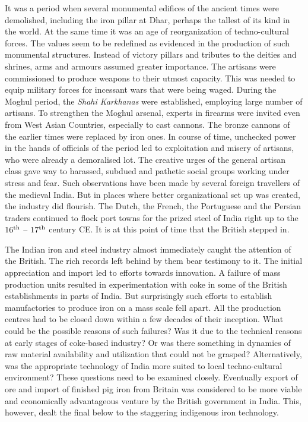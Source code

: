 It was a period when several monumental edifices of the ancient times were demolished, including the iron pillar at Dhar, perhaps the tallest of its kind in the world. At the same time it was an age of reorganization of techno-cultural forces. The values seem to be redefined as evidenced in the production of such monumental structures. Instead of victory pillars and tributes to the deities and shrines, arms and armours assumed greater importance. The artisans were commissioned to produce weapons to their utmost capacity. This was needed to equip military forces for incessant wars that were being waged. During the Moghul period, the \textit{Shahi Karkhanas} were established, employing large number of artisans. To strengthen the Moghul arsenal, experts in firearms were invited even from West Asian Countries, especially to cast cannons. The bronze cannons of the earlier times were replaced by iron ones. In course of time, unchecked power in the hands of officials of the period led to exploitation and misery of artisans, who were already a demoralised lot. The creative urges of the general artisan class gave way to harassed, subdued and pathetic social groups working under stress and fear. Such observations have been made by several foreign travellers of the medieval India. But in places where better organizational set up was created, the industry did flourish. The Dutch, the French, the Portuguese and the Persian traders continued to flock port towns for the prized steel of India right up to the $16^{\rm th}$ – $17^{\rm th}$ century CE. It is at this point of time that the British stepped in.

The Indian iron and steel industry almost immediately caught the attention of the British. The rich records left behind by them bear testimony to it. The initial appreciation and import led to efforts towards innovation. A failure of mass production units resulted in experimentation with coke in some of the British establishments in parts of India. But surprisingly such efforts to establish manufactories to produce iron on a mass scale fell apart. All the production centres had to be closed down within a few decades of their inception. What could be the possible reasons of such failures? Was it due to the technical reasons at early stages of coke-based industry? Or was there something in dynamics of raw material availability and utilization that could not be grasped? Alternatively, was the appropriate technology of India more suited to local techno-cultural environment? These questions need to be examined closely. Eventually export of ore and import of finished pig iron from Britain was considered to be more viable and economically advantageous venture by the British government in India. This, however, dealt the final below to the staggering indigenous iron technology.

